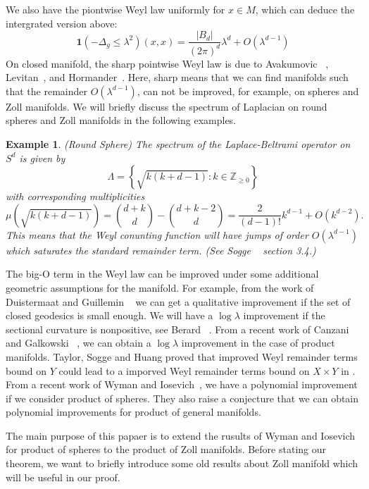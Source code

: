 \documentclass[10pt]{amsart}
\newtheorem{exmp}[theorem]{Example}
\newcommand{\1}{\mathbb{1}}
\newcommand{\Z}{{\mathbb Z}}
\begin{document}
We also have the piontwise Weyl law uniformly for $x\in M$, which can deduce the intergrated version above:
\[
\textbf{1}(- \Delta_g \le \lambda^2)(x,x) = \frac{|B_d|}{(2\pi)^d} \lambda^{d} + O(\lambda^{d - 1}) 
\]
On closed manifold, the sharp pointwise Weyl law is due to Avakumovic ~\cite{Avakumovic}, Levitan~\cite{Levitan}, and Hormander~\cite{Hor68}. Here, sharp means that we can find manifolds such that the remainder $O(\lambda^{d-1})$, can not be improved, for example, on spheres and Zoll manifolds. We will briefly discuss the spectrum of Laplacian on round spheres and Zoll manifolds in the following examples.

\begin{exmp}(Round Sphere) The spectrum of the Laplace-Beltrami operator on $S^d$ is given by 
\[
    \Lambda = \left\{\sqrt{k(k + d - 1)} : k \in \Z_{\geq 0} \right\}
\]
with corresponding multiplicities
\begin{equation}\label{sphere spectrum}
    \mu(\sqrt{k(k + d - 1)}) = \binom{d+k}{d} - \binom{d+k-2}{d} = \frac{2}{(d-1)!} k^{d-1} + O(k^{d-2}).
\end{equation}
This means that the Weyl conunting function will have jumps of order $O(\lambda^{d-1})$ which saturates the standard remainder term. (See Sogge ~\cite{soggefica} section 3.4.)
\end{exmp}


The big-O term in the Weyl law can be improved under some additional geometric assumptions for the manifold. For example, from the work of Duistermaat and Guillemin ~\cite{DuistermaatGuillemin} we can get a qualitative improvement if the set of closed geodesics is small enough. We will have a $\log \lambda$ improvement if the sectional curvature is nonpositive, see Berard ~\cite{Berard}. From a recent work of Canzani and Galkowski ~\cite{CanGal}, we can obtain a $\log \lambda$ improvement in the case of product manifolds. Taylor, Sogge and Huang proved that improved Weyl remainder terms bound on $Y$ could lead to a imporved Weyl remainder terms bound on $X\times Y$ in \cite{HuangTaylorSogge}. From a recent work of Wyman and Iosevich~\cite{IoWy}, we have a polynomial improvement if we consider product of spheres. They also raise a conjecture that we can obtain polynomial improvements for product of general manifolds.

The main purpose of this papaer is to extend the rusults of Wyman and Iosevich for product of spheres to the product of Zoll manifolds. Before stating our theorem, we want to briefly introduce some old results about Zoll manifold which will be useful in our proof.
\end{document}
